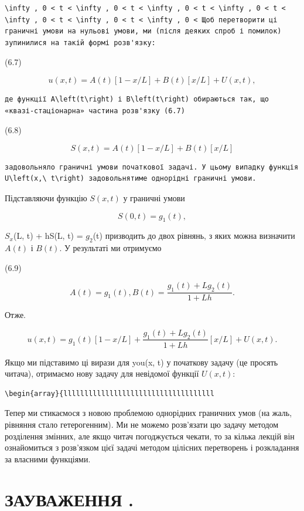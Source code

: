 \documentclass[
  ukrainian,
]{article}
\begin{document}
\begin{verbatim}
\infty , 0 < t < \infty , 0 < t < \infty , 0 < t < \infty , 0 < t < \infty , 0 < t < \infty , 0 < t < \infty , 0 < Щоб перетворити ці граничні умови на нульові умови, ми (після деяких спроб і помилок) зупинилися на такій формі розв'язку:
\end{verbatim}

(6.7)

\[
u(x, t) = A(t)[1-x/L] + B(t)[x/L] + U(x, t),
\]

\begin{verbatim}
де функції A\left(t\right) і B\left(t\right) обираються так, що «квазі-стаціонарна» частина розв'язку (6.7)
\end{verbatim}

(6.8)

\[
S(x, t) = A(t)[1 - x/L] + B(t)[x/L]
\]

\begin{verbatim}
задовольняло граничні умови початкової задачі. У цьому випадку функція U\left(x,\ t\right) задовольнятиме однорідні граничні умови.
\end{verbatim}

Підставляючи функцію \(S(x, t)\) у граничні умови

\[
S(0, t) = g_1(t),
\]

\(S_x\)(L, t) + hS(L, t) = \(g_2\)(t) призводить до двох рівнянь, з яких
можна визначити \(A(t)\) і \(B(t)\). У результаті ми отримуємо

(6.9)

\[
A(t) = g_1(t), B(t) = \frac{g_1(t) + Lg_2(t)}{1 + Lh}.
\]

Отже.

\[
u(x, t) = g_1(t) [1 - x/L] + \frac{g_1(t) + Lg_2(t)}{1 + Lh} [x/L] + U(x, t).
\]

Якщо ми підставимо ці вирази для you(x, t) у початкову задачу (це
просять читача), отримаємо нову задачу для невідомої функції
\(U(x, t)\):

\begin{verbatim}
\begin{array}{llllllllllllllllllllllllllllllllllll
\end{verbatim}

Тепер ми стикаємося з новою проблемою однорідних граничних умов (на
жаль, рівняння стало гетерогенним). Ми не можемо розв'язати цю задачу
методом розділення змінних, але якщо читач погоджується чекати, то за
кілька лекцій він ознайомиться з розв'язком цієї задачі методом цілісних
перетворень і розкладання за власними функціями.

\section{ЗАУВАЖЕННЯ
.}\label{ux437ux430ux443ux432ux430ux436ux435ux43dux43dux44f-.}
\end{document}
